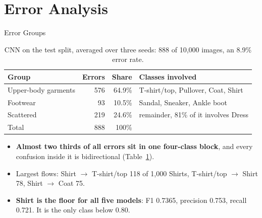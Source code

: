 
\section{Error Analysis}

\begin{frame}{Error Groups}
\begin{table}
\centering
\caption{CNN on the test split, averaged over three seeds: 888 of 10{,}000 images, an 8.9\% error rate.}
\label{tab:error-groups}
\small
\begin{tabular}{lrrl}
\toprule
\textbf{Group} & \textbf{Errors} & \textbf{Share} & \textbf{Classes involved} \\
\midrule
Upper-body garments & 576 & 64.9\% & T-shirt/top, Pullover, Coat, Shirt \\
Footwear            &  93 & 10.5\% & Sandal, Sneaker, Ankle boot \\
Scattered           & 219 & 24.6\% & remainder, 81\% of it involves Dress \\
\midrule
Total               & 888 & 100\%  & \\
\bottomrule
\end{tabular}
\end{table}

\small
\begin{itemize}
    \item \textbf{Almost two thirds of all errors sit in one four-class block}, and every confusion
          inside it is bidirectional (Table~\ref{tab:error-groups}).
    \item Largest flows: Shirt $\to$ T-shirt/top 118 of 1{,}000 Shirts, T-shirt/top $\to$ Shirt 78,
          Shirt $\to$ Coat 75.
    \item \textbf{Shirt is the floor for all five models}: F1 0.7365, precision 0.753, recall 0.721.
          It is the only class below 0.80.
\end{itemize}
\end{frame}

